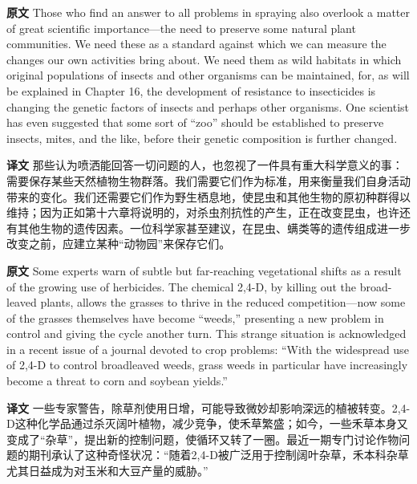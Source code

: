 \documentclass[UTF8,zihao=-4]{ctexart}
\begin{document}
\noindent\textbf{原文} Those who find an answer to all problems in spraying also overlook a matter of great scientific importance---the need to preserve some natural plant communities. We need these as a standard against which we can measure the changes our own activities bring about. We need them as wild habitats in which original populations of insects and other organisms can be maintained, for, as will be explained in Chapter 16, the development of resistance to insecticides is changing the genetic factors of insects and perhaps other organisms. One scientist has even suggested that some sort of ``zoo'' should be established to preserve insects, mites, and the like, before their genetic composition is further changed.
\par
\noindent\textbf{译文} 那些认为喷洒能回答一切问题的人，也忽视了一件具有重大科学意义的事：需要保存某些天然植物生物群落。我们需要它们作为标准，用来衡量我们自身活动带来的变化。我们还需要它们作为野生栖息地，使昆虫和其他生物的原初种群得以维持；因为正如第十六章将说明的，对杀虫剂抗性的产生，正在改变昆虫，也许还有其他生物的遗传因素。一位科学家甚至建议，在昆虫、螨类等的遗传组成进一步改变之前，应建立某种“动物园”来保存它们。
\par\medskip

\noindent\textbf{原文} Some experts warn of subtle but far-reaching vegetational shifts as a result of the growing use of herbicides. The chemical 2,4-D, by killing out the broad-leaved plants, allows the grasses to thrive in the reduced competition---now some of the grasses themselves have become ``weeds,'' presenting a new problem in control and giving the cycle another turn. This strange situation is acknowledged in a recent issue of a journal devoted to crop problems: ``With the widespread use of 2,4-D to control broadleaved weeds, grass weeds in particular have increasingly become a threat to corn and soybean yields.''
\par
\noindent\textbf{译文} 一些专家警告，除草剂使用日增，可能导致微妙却影响深远的植被转变。2,4-D这种化学品通过杀灭阔叶植物，减少竞争，使禾草繁盛；如今，一些禾草本身又变成了“杂草”，提出新的控制问题，使循环又转了一圈。最近一期专门讨论作物问题的期刊承认了这种奇怪状况：“随着2,4-D被广泛用于控制阔叶杂草，禾本科杂草尤其日益成为对玉米和大豆产量的威胁。”
\par\medskip
\end{document}
